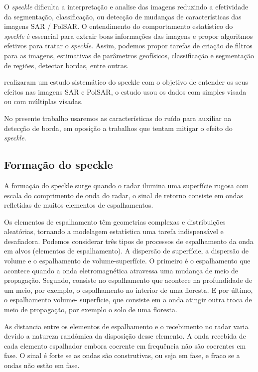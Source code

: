 O \textit{speckle} dificulta a interpretação e analise das imagens reduzindo a efetividade da segmentação, classificação, ou detecção de mudanças de características  das imagens SAR / PolSAR. O entendimento do comportamento estatístico do \textit{speckle} é essencial para extrair boas informações das imagens e propor algoritmos efetivos para tratar o \textit{speckle}. Assim, podemos propor tarefas de criação de filtros para as imagens, estimativas de parâmetros geofísicos, classificação e segmentação de regiões, detectar bordas, entre outras.

\cite{lp} realizaram um estudo sistemático do speckle com o objetivo de entender os seus efeitos nas imagens SAR e PolSAR, o estudo usou os dados com simples visada ou com múltiplas visadas.

No presente trabalho usaremos as características do ruído  para auxiliar na detecção de borda, em oposição a trabalhos que tentam mitigar o efeito do \textit{speckle}.
 
\subsection{Formação do speckle}   
 A formação do speckle surge quando o radar ilumina uma superfície rugosa com escala do comprimento de onda do radar, o sinal de retorno consiste em ondas refletidas de muitos elementos de espalhamentos. 
 
 Os elementos de espalhamento têm geometrias complexas e distribuições aleatórias, tornando a modelagem estatística uma tarefa indispensável e desafiadora. Podemos considerar três tipos de processos de espalhamento da onda em alvos (elementos de espalhamento). A dispersão de superfície, a dispersão de volume e o espalhamento de volume-superfície. O primeiro é o espalhamento que acontece quando a onda eletromagnética atravessa uma mudança de meio de propagação. Segundo, consiste no espalhamento que acontece na profundidade de um meio, por exemplo, o espalhamento no interior de uma floresta. E por último, o espalhamento volume- superfície, que consiste em a onda atingir outra troca de meio de propagação, por exemplo o solo de uma floresta.
 
 As distancia entre os elementos de espalhamento e o recebimento no radar varia devido a natureza randômica da disposição desse elemento. A onda recebida de cada elemento espalhador embora coerente em frequência não são coerentes em fase. O sinal é forte se as ondas são construtivas, ou seja em fase, e fraco se a ondas não estão em fase.
 
